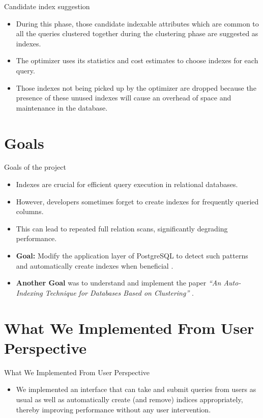 \documentclass[Serif, 10pt, brown]{beamer}
\theoremstyle{example}
\theoremstyle{plain}
\begin{document}
\begin{frame}{Candidate index suggestion}
	\begin{itemize}
		\item During this phase, those candidate indexable attributes which are common to all the queries clustered together during the clustering phase are suggested as indexes.
		\item The optimizer uses its statistics and cost estimates to choose indexes for each query.
		\item Those indexes not being picked up by the optimizer are dropped because the presence of these unused indexes will cause an overhead of space and maintenance in the database.
	\end{itemize}
\end{frame}


\section{Goals}
\begin{frame}{Goals of the project}
	\begin{itemize}
		\item Indexes are crucial for efficient query execution in relational databases.
		\item However, developers sometimes forget to create indexes for frequently queried columns.
		\item This can lead to repeated full relation scans, significantly degrading performance.
		\item {\bf Goal:} Modify the application layer of PostgreSQL to detect such patterns and automatically create indexes when beneficial \cite{nagesh2023indexes}.
		\item {\bf Another Goal} was to understand and implement the paper \textit{``An Auto-Indexing Technique for Databases Based on Clustering''} \cite{1333569}.
	\end{itemize}
\end{frame}

\section{What We Implemented From User Perspective}
\begin{frame}{What We Implemented From User Perspective}
	\begin{itemize}
		\item We implemented an interface that can take and submit queries from users as usual as well as automatically create (and remove) indices appropriately, thereby improving performance without any user intervention.
	\end{itemize}
\end{frame}
\end{document}
